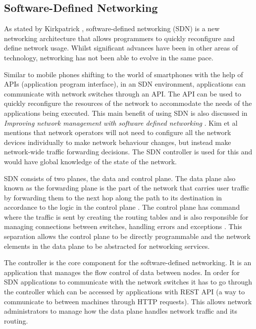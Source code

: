 \subsection{Software-Defined Networking}
As stated by Kirkpatrick \cite{kirkpatrick2013software}, software-defined networking (SDN) is a new networking architecture that allows programmers to quickly reconfigure and define network usage. Whilst significant advances have been in other areas of technology, networking has not been able to evolve in the same pace.
\newline
\par
Similar to mobile phones shifting to the world of smartphones with the help of APIs (application program interface), in an SDN environment, applications can communicate with network switches through an API. The API can be used to quickly reconfigure the resources of the network to accommodate the needs of the applications being executed. This main benefit of using SDN is also discussed in \textit{Improving network management with software defined networking} \cite{kim2013improving}. Kim et al mentions that network operators will not need to configure all the network devices individually to make network behaviour changes, but instead make network-wide traffic forwarding decisions. The SDN controller is used for this and would have global knowledge of the state of the network.
\newline
\par
SDN consists of two planes, the data and control plane. The data plane also known as the forwarding plane is the part of the network that carries user traffic by forwarding them to the next hop along the path to its destination in accordance to the logic in the control plane \cite{dataplane}. The control plane has command where the traffic is sent by creating the routing tables and is also responsible for managing connections between switches, handling errors and exceptions \cite{controlplane}. This separation allows the control plane to be directly programmable and the network elements in the data plane to be abstracted for networking services.
\newline
\par
The controller is the core component for the software-defined networking. It is an application that manages the flow control of data between nodes. In order for SDN applications to communicate with the network switches it has to go through the controller which can be accessed by applications with REST API (a way to communicate to between machines through HTTP requests). This allows network administrators to manage how the data plane handles network traffic and its routing.

